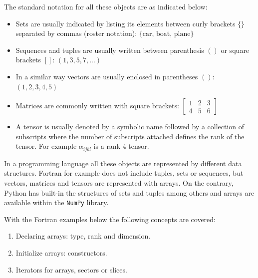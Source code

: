 The standard notation for all these objects are as indicated below:
\begin{itemize}
    \item Sets are usually indicated by listing its elements between curly brackets $\{\}$ separated by commas (roster notation): $\{\textrm{car, boat, plane}\}$
    \item Sequences and tuples are usually written between parenthesis $()$ or square brackets $[]$: $(1,3,5,7,...)$ %
    \item In a similar way vectors are usually enclosed in parentheses $()$: $(1,2,3,4,5)$ %
    \item Matrices are commonly written with square brackets: %
    $
    \begin{bmatrix}
        1 & 2 & 3 \\
        4 & 5 & 6
    \end{bmatrix} 
    $
    \item A tensor is usually denoted by a symbolic name followed by a collection of subscripts where the number of subscripts attached defines the rank of the tensor.
    For example $\alpha_{ijkl}$ is a rank 4 tensor.
\end{itemize}



In a programming language all these objects are represented by different data structures.
Fortran for example does not include tuples, sets or sequences, but vectors, matrices and tensors are represented with arrays. 
On the contrary, Python has built-in the structures of sets and tuples among others and arrays are available within the \texttt{NumPy} library.  

With the Fortran examples below the following concepts are covered:
\begin{enumerate}[noitemsep]
    \item Declaring arrays: type, rank and dimension.
    \item Initialize arrays: constructors. 
    \item Iterators for arrays, sectors or slices. 
\end{enumerate}

